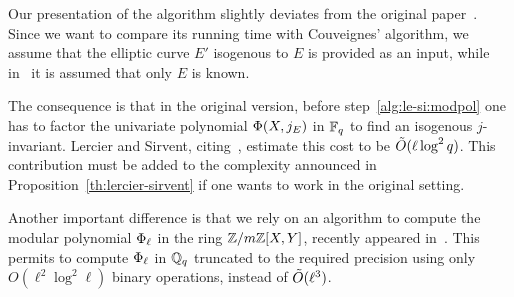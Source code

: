 \begin{remark}
  Our presentation of the algorithm slightly deviates from the
  original paper~\cite{lercier+sirvent08}. Since we want to compare
  its running time with Couveignes' algorithm, we assume that the
  elliptic curve $E'$ isogenous to $E$ is provided as an input, while
  in~\cite{lercier+sirvent08} it is assumed that only $E$ is known.

  The consequence is that in the original version, before
  step~\ref{alg:le-si:modpol} one has to factor the univariate
  polynomial $\Phi(X,j_E)$ in $\mathbb{F}_q$ to find an isogenous
  $j$-invariant. Lercier and Sirvent,
  citing~\cite{lidl+niederreiter:2}, estimate this cost to be
  $\tilde{O}(\ell\log^2 q)$. This contribution must be added to the
  complexity announced in Proposition~\ref{th:lercier-sirvent} if one
  wants to work in the original setting.

  Another important difference is that we rely on an algorithm to
  compute the modular polynomial $\Phi_\ell$ in the ring
  $\mathbb{Z}/m\mathbb{Z}[X,Y]$, recently appeared in~\cite{sutherland10:modpol}. This
  permits to compute $\Phi_\ell$ in $\mathbb{Q}_q$ truncated to the
  required precision using only $O(\ell^2\log^2\ell)$ binary
  operations, instead of $\tilde{O}(\ell^3)$.
\end{remark}


